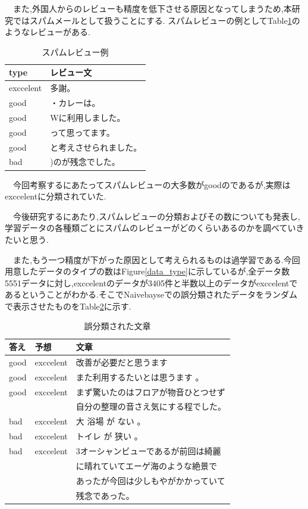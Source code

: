 \documentclass[twocolumn,dvipdfmx]{article}
\newcounter{ex}
\begin{document}
　また,外国人からのレビューも精度を低下させる原因となってしまうため,本研究ではスパムメールとして扱うことにする.
 スパムレビューの例としてTable\ref{spam}のようなレビューがある.
 \begin{table}[H]\centering
  \caption{スパムレビュー例}
  \label{spam}
\begin{tabular}{|l|l|} \hline
   type & レビュー文   \\ \hline
   exccelent& 多謝。   \\\hline
   good &  ・カレーは。 \\ 
   good & Wに利用しました。\\
   good & って思ってます。 \\
   good & と考えさせられました。 \\ \hline
   bad  & )のが残念でした。 \\ \hline
\end{tabular}
\end{table}
　今回考察するにあたってスパムレビューの大多数がgoodのであるが,実際はexccelentに分類されていた.

　今後研究するにあたり,スパムレビューの分類およびその数についても発表し,学習データの各種類ごとにスパムのレビューがどのくらいあるのかを調べていきたいと思う.

　また,もう一つ精度が下がった原因として考えられるものは過学習である.今回用意したデータのタイプの数はFigure\ref{data_type}に示しているが,全データ数5551データに対し,exccelentのデータが3405件と半数以上のデータがexccelentであるということがわかる.そこでNaivebayseでの誤分類されたデータをランダムで表示させたものをTable\ref{matigae}に示す.

\begin{table}[htbp]\centering
  \caption{誤分類された文章}
  \label{matigae}
\begin{tabular}{|l|l|l|} \hline
   答え & 予想 & 文章  \\ \hline
   good & exccelent &  改善が必要だと思うます \\
   good & exccelent & また利用するたいとは思うます 。\\
   good & exccelent & まず驚いたのはフロアが物音ひとつせず\\
        &            &自分の整理の音さえ気にする程でした。\\
   bad & exccelent  & 大 浴場 が ない 。\\
   bad & exccelent  &トイレ が 狭い 。\\
   bad & exccelent & 3オーシャンビューであるが前回は綺麗\\
       &            &に晴れていてエーゲ海のような絶景で\\
       &            &あったが今回は少しもやがかかっていて\\
       &            &残念であった。\\ \hline
\end{tabular}
\end{table}
\end{document}
